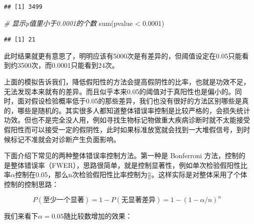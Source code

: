 \documentclass[]{tufte-book}
\newenvironment{Shaded}{}{}
\newcommand{\CommentTok}[1]{\textcolor[rgb]{0.38,0.63,0.69}{\textit{#1}}}
\newcommand{\FloatTok}[1]{\textcolor[rgb]{0.25,0.63,0.44}{#1}}
\newcommand{\FunctionTok}[1]{\textcolor[rgb]{0.02,0.16,0.49}{#1}}
\newcommand{\NormalTok}[1]{#1}
\newcommand{\SpecialCharTok}[1]{\textcolor[rgb]{0.25,0.44,0.63}{#1}}
\begin{document}
\begin{verbatim}
## [1] 3499
\end{verbatim}

\begin{Shaded}
\begin{Highlighting}[]
\CommentTok{\# 显示p值里小于0.0001的个数}
\FunctionTok{sum}\NormalTok{(pvalue }\SpecialCharTok{\textless{}} \FloatTok{0.0001}\NormalTok{)}
\end{Highlighting}
\end{Shaded}

\begin{verbatim}
## [1] 21
\end{verbatim}

此时结果就更有意思了，明明应该有5000次是有差异的，但阈值设定在0.05只能看到约3500次，而0.0001只能看到24次。

上面的模拟告诉我们，降低假阳性的方法会提高假阴性的比率，也就是功效不足，无法发现本来就有的差异。而且似乎本来0.05的阈值对于真阳性也是偏小的。同时，面对假设检验概率低于0.05的那些差异，我们也没有很好的方法区别哪些是真的，哪些是随机的。其实很多人都知道整体错误率控制是比较严格的，会损失统计功效。但也不是完全没人用，例如寻找生物标记物做重大疾病诊断时就不太能接受假阳性而可以接受一定的假阴性，此时如果标准放宽就会找到一大堆假信号，到时候标记不准就会对诊断产生负面影响。

下面介绍下常见的两种整体错误率控制方法。第一种是 Bonferroni 方法，控制的是整体错误率（FWER），思路很简单，就是控制显著性，例如单次检验假阳性比率\(\alpha\)控制在0.05，那么n次检验假阳性比率控制为\(\frac{\alpha}{n}\)。这样实际是对整体采用了个体控制的控制思路：

\[
P(至少一个显著)=1-P(无显著差异) = 1-(1-\alpha/n)^n
\]

我们来看下\(\alpha = 0.05\)随比较数增加的效果：
\end{document}
